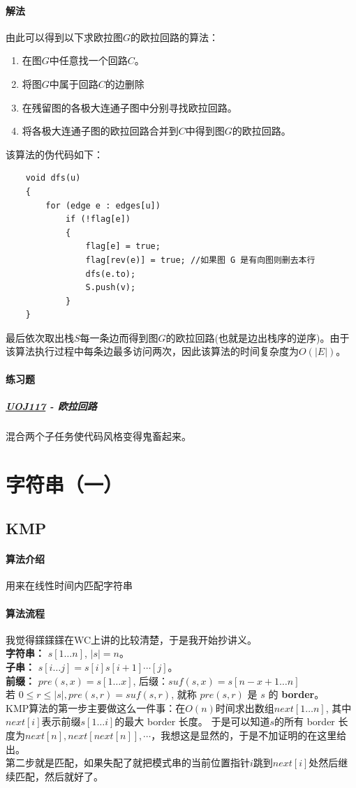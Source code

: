 \documentclass[]{cpp}
\begin{document}
\paragraph{解法}
	由此可以得到以下求欧拉图$G$的欧拉回路的算法：
	\begin{enumerate}
		\item 在图$G$中任意找一个回路$C$。
		\item 将图$G$中属于回路$C$的边删除
		\item 在残留图的各极大连通子图中分别寻找欧拉回路。
		\item 将各极大连通子图的欧拉回路合并到$C$中得到图$G$的欧拉回路。
	\end{enumerate}
	该算法的伪代码如下：
	\begin{verbatim}
	void dfs(u)
	{
	    for (edge e : edges[u])
	        if (!flag[e])
	        {
	            flag[e] = true;
	            flag[rev(e)] = true; //如果图 G 是有向图则删去本行
	            dfs(e.to);
	            S.push(v);
	        }
	}
	\end{verbatim}
	最后依次取出栈$S$每一条边而得到图$G$的欧拉回路(也就是边出栈序的逆序)。由于该算法执行过程中每条边最多访问两次，因此该算法的时间复杂度为$O(|E|)$。
\paragraph{练习题}
\subparagraph{\href{http://uoj.ac/problem/117}{UOJ117} - 欧拉回路}
混合两个子任务使代码风格变得鬼畜起来。
\section{字符串（一）}
\subsection{KMP}
\paragraph{算法介绍} 用来在线性时间内匹配字符串
\paragraph{算法流程}
	我觉得鏼鏼鏼在WC上讲的比较清楚，于是我开始抄讲义。\\
	\textbf{字符串：} $s[1\ldots n]$, $|s| = n$。\\
	\textbf{子串：} $s[i\ldots j] = s[i]s[i + 1]\cdots[j]$。\\
	\textbf{前缀：} $pre(s,x) = s[1\ldots x]$, 后缀：$suf(s,x) = s[n − x + 1\ldots n]$\\
	若 $0 \leq r \le |s|, pre(s,r) = suf(s,r)$, 就称 $pre(s,r)$ 是 $s$ 的 \textbf{border}。\\
	KMP算法的第一步主要做这么一件事：在$O(n)$时间求出数组$next[1\ldots n]$, 其中$next[i]$表示前缀$s[1\ldots i]$的最大 border 长度。
	于是可以知道$s$的所有 border 长度为${next[n],next[next[n]],\cdots}$，我想这是显然的，于是不加证明的在这里给出。\\
	第二步就是匹配，如果失配了就把模式串的当前位置指针$i$跳到$next[i]$处然后继续匹配，然后就好了。
\end{document}
